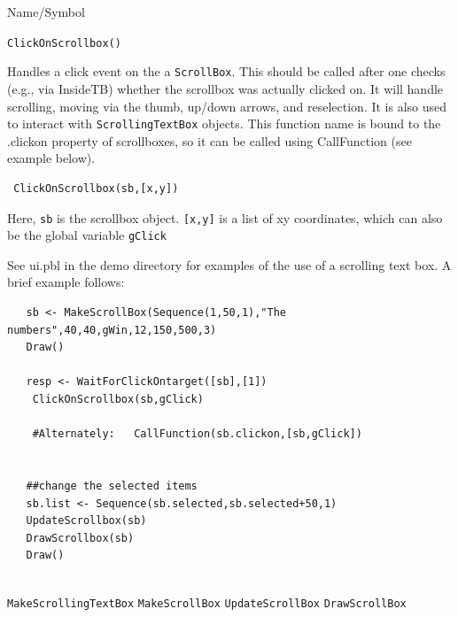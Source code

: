 \begin{desc}{Name/Symbol}
\item[Name/Symbol]  	\verb+ClickOnScrollbox()+

\item[Description]	
Handles a click event on the a  \verb+ScrollBox+. This should be called after one checks (e.g., via InsideTB) whether the scrollbox was actually clicked on.  It will handle scrolling, moving via the thumb, up/down arrows, and reselection. It is also used to interact with \verb+ScrollingTextBox+  objects. This function name is bound to the .clickon property of scrollboxes, so it can be called using CallFunction (see example below).

\item[Usage]
\begin{verbatim}
 ClickOnScrollbox(sb,[x,y])
  \end{verbatim}

Here, \texttt{sb} is the scrollbox object. \texttt{[x,y]} is a list of xy coordinates, which can also be the global variable \texttt{gClick}

\item[Example]      	
See ui.pbl in the demo directory for examples of the use of a scrolling text box.  A brief example follows:

\begin{verbatim}
   sb <- MakeScrollBox(Sequence(1,50,1),"The numbers",40,40,gWin,12,150,500,3)
   Draw()
	  
   resp <- WaitForClickOntarget([sb],[1])
    ClickOnScrollbox(sb,gClick) 
 
    #Alternately:   CallFunction(sb.clickon,[sb,gClick])

 
   ##change the selected items
   sb.list <- Sequence(sb.selected,sb.selected+50,1)
   UpdateScrollbox(sb)      
   DrawScrollbox(sb)
   Draw()
 
\end{verbatim}

\item[See Also]
\verb+MakeScrollingTextBox+
\verb+MakeScrollBox+
\verb+UpdateScrollBox+
\verb+DrawScrollBox+
\end{desc}


